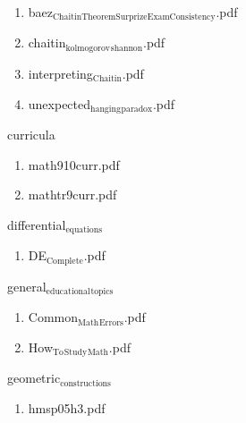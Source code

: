 \documentclass[11pt]{article}
\begin{document}
\begin{enumerate}
\item baez$_{\text{ChaitinTheoremSurprizeExamConsistency}}$.pdf
\label{sec-1-1-1-1-29-27-2}

\item chaitin$_{\text{kolmogorov}}$$_{\text{shannon}}$.pdf
\label{sec-1-1-1-1-29-27-3}

\item interpreting$_{\text{Chaitin}}$.pdf
\label{sec-1-1-1-1-29-27-4}

\item unexpected$_{\text{hanging}}$$_{\text{paradox}}$.pdf
\label{sec-1-1-1-1-29-27-5}
\end{enumerate}

\item curricula
\label{sec-1-1-1-1-29-28}
\begin{enumerate}
\item math910curr.pdf
\label{sec-1-1-1-1-29-28-1}

\item mathtr9curr.pdf
\label{sec-1-1-1-1-29-28-2}
\end{enumerate}

\item differential$_{\text{equations}}$
\label{sec-1-1-1-1-29-29}
\begin{enumerate}
\item DE$_{\text{Complete}}$.pdf
\label{sec-1-1-1-1-29-29-1}
\end{enumerate}

\item general$_{\text{educational}}$$_{\text{topics}}$
\label{sec-1-1-1-1-29-30}
\begin{enumerate}
\item Common$_{\text{Math}}$$_{\text{Errors}}$.pdf
\label{sec-1-1-1-1-29-30-1}

\item How$_{\text{To}}$$_{\text{Study}}$$_{\text{Math}}$.pdf
\label{sec-1-1-1-1-29-30-2}
\end{enumerate}

\item geometric$_{\text{constructions}}$
\label{sec-1-1-1-1-29-31}
\begin{enumerate}
\item hmsp05h3.pdf
\label{sec-1-1-1-1-29-31-1}
\end{enumerate}
\end{document}
